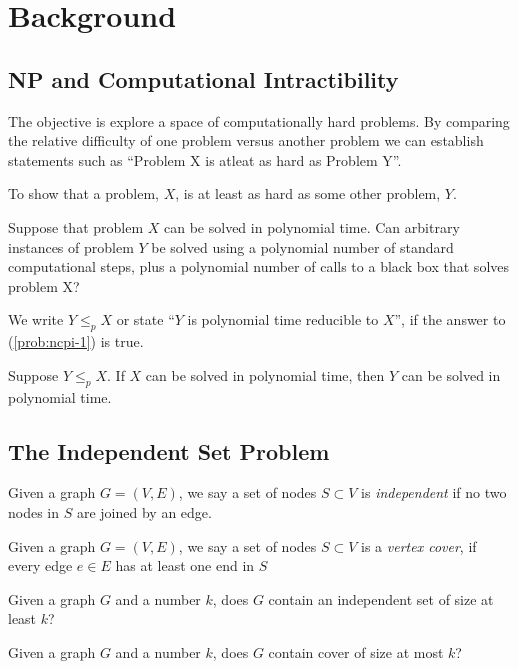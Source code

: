 \section{Background}
\subsection{NP and Computational Intractibility}
The objective is explore a space of computationally hard problems.  By comparing the relative difficulty of one
problem versus another problem we can establish statements such as ``Problem X is atleat as hard as Problem Y''.
\begin{definition}[Reduction]\label{def:ncpi-1}
To show that a problem, $X$,  is at least as hard as some other problem, $Y$.
\end{definition} 
\begin{prob}\label{prob:ncpi-1}%
Suppose that problem $X$ can be solved in polynomial time.  Can arbitrary instances of problem $Y$ be solved using
a polynomial number of standard computational steps, plus a polynomial number of calls to a black box that solves
problem X?
\end{prob}
We write $Y \leq_p X$ or state ``$Y$ is polynomial time reducible to $X$'', if the answer to (\ref{prob:ncpi-1}) is
true.
\begin{thm}\label{thm:ncpi-1}
Suppose $Y \leq_p X$.  If $X$ can be solved in polynomial time, then $Y$ can be solved in polynomial time.
\end{thm} 
\subsection{The Independent Set Problem}
\begin{definition}\label{def:ncpi-2}
Given a graph $G = (V,E)$, we say a set of nodes $S \subset V$ is \textit{independent} if no two nodes in $S$ are
joined by an edge.
\end{definition} 
\begin{definition}\label{def:ncpi-3}
Given a graph $G = (V,E)$, we say a set of nodes $S \subset V$ is a \textit{vertex cover}, if every edge $e \in E$
has at least one end in $S$
\end{definition} 
\begin{prob}\label{prob:ncpi-2}%
Given a graph $G$ and a number $k$, does $G$ contain an independent set of size at least $k$?
\end{prob} 
\begin{prob}\label{prob:ncpi-5}%
Given a graph $G$ and a number $k$, does $G$ contain cover of size at most $k$?
\end{prob} 
